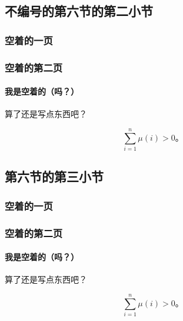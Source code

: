 \documentclass{../pkslide}
\begin{document}
\subsection*{不编号的第六节的第二小节}

\begin{frame}
  \frametitle{空着的一页}
\end{frame}

\begin{frame}
  \frametitle{空着的第二页}
  \framesubtitle{我是空着的（吗？）}
  
  算了还是写点东西吧？
  
  \[ \sum_{i = 1}^{n} \mu(i) > 0 \text{。} \]
\end{frame}

\subsection{第六节的第三小节}

\begin{frame}
  \frametitle{空着的一页}
\end{frame}

\begin{frame}
  \frametitle{空着的第二页}
  \framesubtitle{我是空着的（吗？）}
  
  算了还是写点东西吧？
  
  \[ \sum_{i = 1}^{n} \mu(i) > 0 \text{。} \]
\end{frame}
\end{document}
